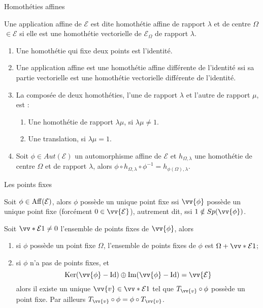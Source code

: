 \documentclass[
bigger]{m53beamer}
\begin{document}
  \begin{frame}{Homothéties affines}
    \begin{definition}
      Une application affine de $\mathcal{E}$ est dite \alert{homothétie affine de rapport $\lambda$ et de centre $\Omega$}$\in\mathcal{E}$ si elle est une homothétie vectorielle de $\mathcal{E}_{\Omega}$ de rapport $\lambda$.
    \end{definition}
    \begin{enumerate}[<+(1)->]
      \item Une homothétie qui fixe deux points est l'identité.
      \item Une application affine est une homothétie affine différente de l'identité ssi sa partie vectorielle est une homothétie vectorielle différente de l'identité.
      \item La composée de deux homothéties, l'une de rapport $\lambda$ et l'autre de rapport $\mu$, est :
      \begin{enumerate}[<+(1)->]
        \item Une homothétie de rapport $\lambda\mu$, si $\lambda\mu \neq 1$.
        \item Une translation, si $\lambda\mu=1$.
      \end{enumerate}
      \item Soit $\phi \in Aut(\mathcal{E})$ un automorphisme affine de $\mathcal{E}$ et $h_{\Omega,\lambda}$ une homothétie de centre $\Omega$ et de rapport $\lambda$, alors $\phi\circ h_{\Omega,\lambda}\circ\phi^{-1}=h_{\phi(\Omega),\lambda}$.
    \end{enumerate}
  \end{frame}
  \begin{frame}{Les points fixes}
    \begin{proposition}
      Soit $\phi\in\operatorname{Aff}(\mathcal{E})$, alors $\phi$ possède un unique point fixe ssi $\vv{\phi}$ possède un unique point fixe (forcément $0\in\vv{\mathcal{E}}$)\pause, autrement dit, ssi $1 \notin Sp(\vv{\phi})$.
    \end{proposition}\pause
    \begin{proposition}
      Soit $\vv*{\mathcal{E}}{1} \neq 0$ l'ensemble de points fixes de $\vv{\phi}$, alors
      \begin{enumerate}[<+(1)->]
        \item si $\phi$ possède un point fixe $\Omega$, l'ensemble de points fixes de $\phi$ est $\Omega+\vv*{\mathcal{E}}{1}$;
        \item si $\phi$ n'a pas de points fixes\pause, et
          $$
            \ker(\vv{\phi}-\id) \oplus \im(\vv{\phi}-\id) = \vv{\mathcal{E}}
          $$\pause
        alors il existe un unique $\vv{v}\in\vv*{\mathcal{E}}{1}$ tel que $T_{\vv{v}}\circ\phi$ possède un point fixe.\newline\pause
        Par ailleurs $T_{\vv{v}}\circ\phi=\phi\circ T_{\vv{v}}$.
      \end{enumerate}
    \end{proposition}
  \end{frame}
\end{document}
